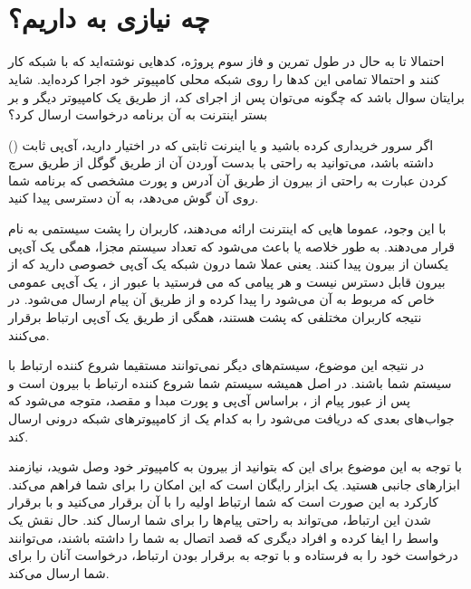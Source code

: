 \documentclass[]{article}
\begin{document}
\KashidaOff



\newpage

 \Large \textbf{\\\\
}


\section*{{\titr چه نیازی به  داریم؟}}

احتمالا تا به حال در طول تمرین و فاز سوم پروژه، کدهایی نوشته‌اید که با شبکه کار کنند و احتمالا تمامی این کدها را روی شبکه محلی کامپیوتر خود اجرا کرده‌اید. شاید برایتان سوال باشد که چگونه می‌توان پس از اجرای کد، از طریق یک کامپیوتر دیگر و بر بستر اینترنت به آن برنامه درخواست ارسال کرد؟

اگر سرور خریداری کرده باشید و یا اینرنت ثابتی که در اختیار دارید، آی‌پی ثابت () داشته باشد، می‌توانید به راحتی با بدست آوردن  آن از طریق گوگل از طریق سرچ کردن عبارت  به راحتی از بیرون  از طریق آن  آدرس و پورت مشخصی که برنامه شما روی آن گوش می‌دهد، به آن دسترسی پیدا کنید.

با این وجود، عموما   هایی که اینترنت  ارائه می‌دهند، کاربران را پشت سیستمی به نام  قرار می‌دهند. به طور خلاصه  یا  باعث می‌شود که تعداد سیستم مجزا، همگی یک آی‌پی یکسان از بیرون پیدا کنند. یعنی عملا شما درون شبکه  یک آی‌پی خصوصی دارید که از بیرون قابل دسترس نیست و هر پیامی که می فرستید با عبور از ، یک آی‌پی عمومی خاص که مربوط به آن  می‌شود را پیدا کرده و از طریق آن پیام ارسال می‌شود. در نتیجه کاربران مختلفی که پشت  هستند، همگی از طریق یک آی‌پی ارتباط برقرار می‌کنند.

در نتیجه این موضوع، سیستم‌های دیگر نمی‌توانند مستقیما شروع کننده ارتباط با سیستم شما باشند. در اصل همیشه سیستم شما شروع کننده ارتباط با بیرون است و پس از عبور پیام از ، براساس آی‌پی و پورت مبدا و مقصد،  متوجه می‌شود که جواب‌های بعدی که دریافت می‌شود را به کدام یک از کامپیوترهای شبکه درونی ارسال کند.

با توجه به این موضوع برای این که بتوانید از بیرون به کامپیوتر خود وصل شوید، نیازمند ابزارهای جانبی هستید.  یک ابزار رایگان است که این امکان را برای شما فراهم می‌کند. کارکرد  به این صورت است که شما ارتباط اولیه را با آن برقرار می‌کنید و با برقرار شدن این ارتباط،  می‌تواند به راحتی پیام‌ها را برای شما ارسال کند. حال  نقش یک واسط را ایفا کرده و افراد دیگری که قصد اتصال به شما را داشته باشند، می‌توانند درخواست خود را به  فرستاده و  با توجه به برقرار بودن ارتباط، درخواست آنان را برای شما ارسال می‌کند.
\end{document}
